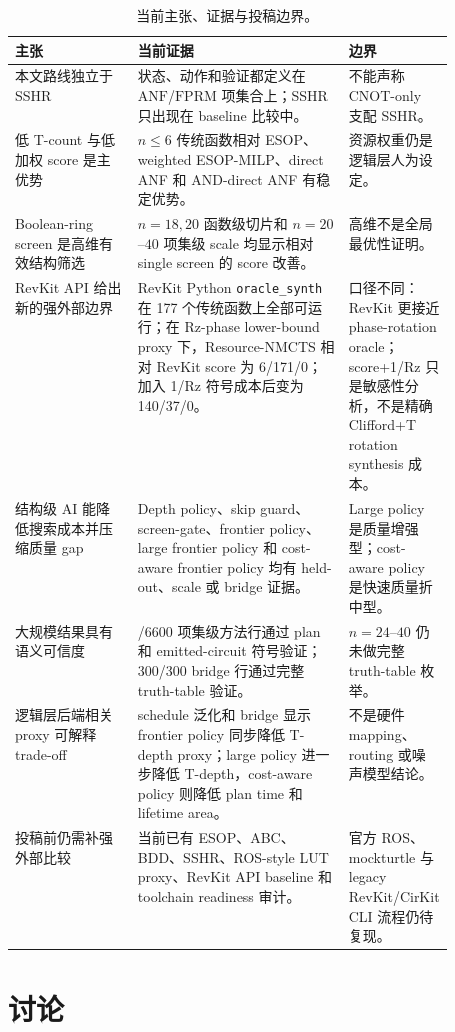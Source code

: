 \documentclass[UTF8,fontset=macnew,11pt]{ctexart}
\newcommand{\method}{Resource-NMCTS}
\newcommand{\screen}{Boolean-ring screen}
\newcommand{\anf}{\ensuremath{\mathrm{ANF}}}
\newcommand{\fprm}{\ensuremath{\mathrm{FPRM}}}
\newcommand{\ttable}{truth-table}
\begin{document}
\begin{table}[H]
\centering
\small
\caption{当前主张、证据与投稿边界。}
\label{tab:evidence-map}
\begin{tabularx}{\linewidth}{>{\raggedright\arraybackslash}p{0.28\linewidth}>{\raggedright\arraybackslash}X>{\raggedright\arraybackslash}p{0.23\linewidth}}
\toprule
主张 & 当前证据 & 边界 \\
\midrule
本文路线独立于 SSHR & 状态、动作和验证都定义在 \anf{}/\fprm{} 项集合上；SSHR 只出现在 baseline 比较中。 & 不能声称 CNOT-only 支配 SSHR。 \\
低 T-count 与低加权 score 是主优势 & $n\leq6$ 传统函数相对 ESOP、weighted ESOP-MILP、direct ANF 和 AND-direct ANF 有稳定优势。 & 资源权重仍是逻辑层人为设定。 \\
\screen{} 是高维有效结构筛选 & $n=18,20$ 函数级切片和 $n=20$--$40$ 项集级 scale 均显示相对 single screen 的 score 改善。 & 高维不是全局最优性证明。 \\
RevKit API 给出新的强外部边界 & RevKit Python \texttt{oracle\_synth} 在 177 个传统函数上全部可运行；在 Rz-phase lower-bound proxy 下，\method{} 相对 RevKit score 为 6/171/0；加入 1/Rz 符号成本后变为 140/37/0。 & 口径不同：RevKit 更接近 phase-rotation oracle；score+1/Rz 只是敏感性分析，不是精确 Clifford+T rotation synthesis 成本。 \\
结构级 AI 能降低搜索成本并压缩质量 gap & Depth policy、skip guard、screen-gate、frontier policy、large frontier policy 和 cost-aware frontier policy 均有 held-out、scale 或 bridge 证据。 & Large policy 是质量增强型；cost-aware policy 是快速质量折中型。 \\
大规模结果具有语义可信度 & 6600/6600 项集级方法行通过 plan 和 emitted-circuit 符号验证；300/300 bridge 行通过完整 \ttable{} 验证。 & $n=24$--$40$ 仍未做完整 \ttable{} 枚举。 \\
逻辑层后端相关 proxy 可解释 trade-off & schedule 泛化和 bridge 显示 frontier policy 同步降低 T-depth proxy；large policy 进一步降低 T-depth，cost-aware policy 则降低 plan time 和 lifetime area。 & 不是硬件 mapping、routing 或噪声模型结论。 \\
投稿前仍需补强外部比较 & 当前已有 ESOP、ABC、BDD、SSHR、ROS-style LUT proxy、RevKit API baseline 和 toolchain readiness 审计。 & 官方 ROS、mockturtle 与 legacy RevKit/CirKit CLI 流程仍待复现。 \\
\bottomrule
\end{tabularx}
\end{table}

\section{讨论}
\end{document}

